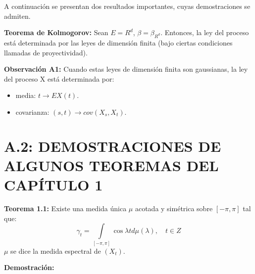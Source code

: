 A continuaci\'{o}n se presentan dos resultados importantes, cuyas demostraciones se admiten.\newline

\textbf{Teorema de Kolmogorov:} Sean $E=R^{d}$, $\beta =\beta_{R^{d}} $. Entonces, la ley del proceso est\'{a} determinada por las leyes de dimensi\'{o}n finita (bajo ciertas condiciones llamadas de proyectividad).\newline

\textbf{Observaci\'{o}n A1:} Cuando estas leyes de dimensi\'{o}n finita son gaussianas, la ley del proceso X est\'{a} determinada por:
\begin{itemize}
      \item media: $t\to EX(t)$.
      \item covarianza: $\left( {s,t} \right)\to cov\left( {X_{s}, X_{t} } \right)$.
\end{itemize}

\section*{A.2: DEMOSTRACIONES DE ALGUNOS TEOREMAS DEL CAP\'{I}TULO 1}
\textbf{Teorema 1.1:} Existe una medida \'{u}nica $\mu$ acotada y sim\'{e}trica sobre $\left[ {-\pi ,\pi } \right]$ tal que:
\[
\gamma_{t} =\int\limits_{\left[ {-\pi ,\pi } \right]} {\cos \lambda t d\mu \left( \lambda \right)}, \quad t\in Z
\]
$\mu$ se dice la medida espectral de $\left( {X_{t} } \right)$.\newline

\textbf{Demostraci\'{o}n:}\newline

